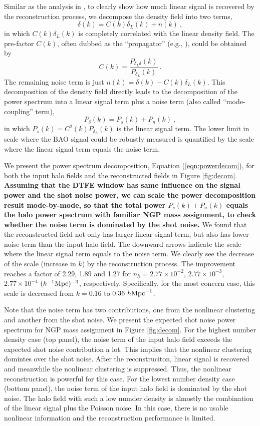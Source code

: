 \documentclass[iop]{emulateapj}
\newcommand{\be}{\begin{equation}}
\newcommand{\ee}{\end{equation}}
\newcommand{\mpch}{h^{-1} {\rm Mpc}}
\newcommand{\hmpc}{h {\rm Mpc}^{-1}}
\begin{document}
{Similar as the analysis in \cite{Seo16}, to clearly show how much linear signal is recovered by the reconstruction process,
we decompose the density field into two terms, 
\be
\delta(k)=C(k)\delta_L(k)+n(k)\ ,
\ee
in which $C(k)\delta_L(k)$ is completely correlated with the linear density field.
The pre-factor $C(k)$, often dubbed as the ``propagator'' (e.g., \cite{Crocce06,Crocce08,Matsubara08,Taruya09}), could be obtained by
\be
C(k)=\frac{P_{\delta_L\delta}(k)}{P_{\delta_L}(k)}\ .
\ee
The remaining noise term is just $n(k)=\delta(k)-C(k)\delta_L(k)$.
This decomposition of the density field directly leads to the decomposition of the power spectrum into a linear signal term plus a noise term (also called ``mode-coupling'' term),
\be
\label{eqn:powerdecom}
P_\delta(k)=P_s(k)+P_n(k)\ ,
\ee
in which $P_s(k)=C^2(k)P_{\delta_L}(k)$ is the linear signal term.
The lower limit in scale where the BAO signal could be robustly measured is quantified by the scale where the linear signal term equals the noise term.

We present the power spectrum decomposition, Equation (\ref{eqn:powerdecom}), for both the input halo fields and the reconstructed fields in Figure \ref{fig:decom}.
{\bf Assuming that the DTFE window has same influence on the signal power and the shot noise power,
we can scale the power decomposition result mode-by-mode, so that the total power $P_s(k)+P_n(k)$ equals the halo power spectrum with familiar NGP mass assignment, to check whether the noise term is dominated by the shot noise.}
We found that the reconstructed field not only has larger linear signal term, but also has lower noise term than the input halo field.
The downward arrows indicate the scale where the linear signal term equals to the noise term.
We clearly see the decrease of the scale (increase in $k$) by the reconstruction process.
The improvement reaches a factor of 2.29, 1.89 and 1.27 for $n_h=2.77\times 10^{-2}$, $2.77\times 10^{-3}$, $2.77\times 10^{-4}$ $(\mpch)^{-3}$, respectively.
Specifically, for the most concern case, this scale is decreased from $k=0.16$ to $0.36\ \hmpc$.

Note that the noise term has two contributions, one from the nonlinear clustering and another from the shot noise.
We present the expected shot noise power spectrum for NGP mass assignment in Figure \ref{fig:decom}.
For the highest number density case (top panel), the noise term of the input halo field exceeds the expected shot noise contribution a lot.
This implies that the nonlinear clustering domintes over the shot noise.
After the reconstruciton, linear signal is recovered and meanwhile the nonlinear clustering is suppressed.
Thus, the nonlinear reconstruction is powerful for this case.
For the lowest number density case (bottom panel), the noise term of the input halo field is dominated by the shot noise.
The halo field with such a low numder density is almostly the combination of the linear signal plus the Poisson noise.
In this case, there is no usable nonlinear information and the reconstruction performance is limited.

}
\end{document}
